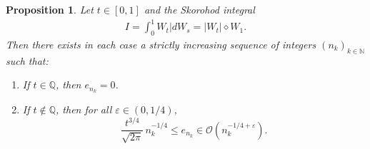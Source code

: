 \documentclass[a4paper,11pt,reqno]{amsart}
\theoremstyle{plain}
\newtheorem{proposition}[theorem]{Proposition}
\def\N{\mathbb{N}}
\def\Q{\mathbb{Q}}
\def\Oo{\mathcal{O}}
\def\ex{\mathbb{E}}
\def\ve{\varepsilon}
\numberwithin{equation}{section}
\begin{document}


\begin{proposition}\label{prop:OptimalApproxAbsoluteValue}
Let $t \in [0,1]$ and the Skorohod integral
\begin{align}\label{eq:SkorohodAbsValue} 
I=\int_{0}^{1} W_t| dW_s = |W_t| \diamond W_1.
\end{align}
Then there exists in each case a strictly increasing sequence of integers $(n_k)_{k \in \N}$ such that:
\begin{enumerate}
 \item[(i)] If $t \in \Q$, then $e_{n_k}=0$.
 \item[(ii)] If $t \notin \Q$, then for all $\ve\in (0,1/4)$,
\begin{equation}\label{eq:thmOptApproxAbsValue1}
\frac{t^{3/4}}{\sqrt{2\pi}} \, n_k^{-1/4} \leq e_{n_k} \in \Oo(n_k^{-1/4+\ve}).
\end{equation}
\end{enumerate}
\end{proposition}
\end{document}
